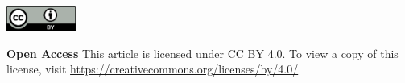 \vspace{8mm}
\noindent
\includegraphics[height=8mm]{licenses/by}

\begin{spacing}{.6}
\noindent
\textbf{Open Access} This article is licensed under CC BY 4.0. To view a copy of this license, visit \url{https://creativecommons.org/licenses/by/4.0/}
\end{spacing}